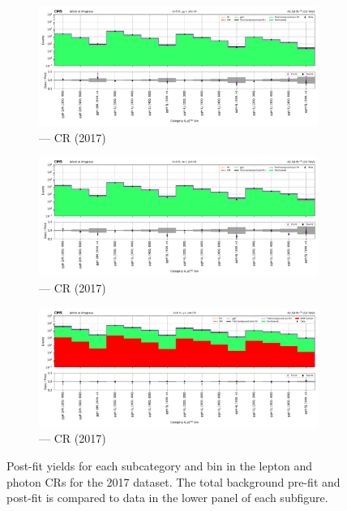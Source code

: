 \begin{figure}[htbp]
    \begin{subfigure}[b]{0.49\textwidth}
        \includegraphics[width=\textwidth]{chapters/higgstoinv/figures/mountain_ranges/2017/ggF/Zmumu_tree_fit_s-abs_values_ggF_cats.pdf}
        \caption{\ggH --- \doubleMuCr \gls{CR} (2017)}
    \end{subfigure}
    \hfill
    \begin{subfigure}[b]{0.49\textwidth}
        \includegraphics[width=\textwidth]{chapters/higgstoinv/figures/mountain_ranges/2017/ggF/Zee_tree_fit_s-abs_values_ggF_cats.pdf}
        \caption{\ggH --- \doubleEleCr \gls{CR} (2017)}
    \end{subfigure}

    \begin{subfigure}[b]{0.49\textwidth}
        \includegraphics[width=\textwidth]{chapters/higgstoinv/figures/mountain_ranges/2017/ggF/Photon_tree_fit_s-abs_values_ggF_cats.pdf}
        \caption{\ggH --- \singlePhotonCr \gls{CR} (2017)}
    \end{subfigure}
    \caption[Post-fit yields for each \ggH subcategory and \ptmiss bin in the lepton and photon control regions for the 2017 dataset]{Post-fit yields for each \ggH subcategory and \ptmiss bin in the lepton and photon \glspl{CR} for the 2017 dataset. The total background pre-fit and post-fit is compared to data in the lower panel of each subfigure.}
    \label{fig:htoinv_mountain_range_ggF_2017_CRs}
\end{figure}


